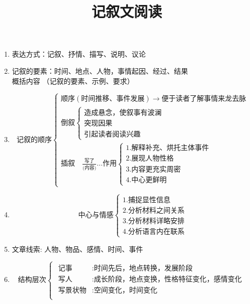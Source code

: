 \documentclass[11pt]{article}
\title{记叙文阅读}
\begin{document}
\maketitle

\begin{enumerate}
\item 表达方式：记叙、抒情、描写、说明、议论

\item 记叙的要素：时间、地点、人物，事情起因、经过、结果 \\
   概括内容 （记叙的要素、示例、要求）

\item
$$
\mbox{记叙的顺序}
\begin{cases}
\mbox{顺序} ( \mbox{时间推移、事件发展} ) \rightarrow \mbox{便于读者了解事情来龙去脉} \\
\mbox{倒叙} 
 \begin{cases}
 \mbox{造成悬念，使叙事有波澜} \\
 \mbox{突现因果} \\
 \mbox{引起读者阅读兴趣}
 \end{cases} \\
\mbox{插叙} \quad \frac{\mbox{写了}}{\mbox{(内容)}} ... \mbox{作用}
  \begin{cases}
  1. \mbox{解释补充、烘托主体事件} \\
  2. \mbox{展现人物性格} \\
  3. \mbox{内容更充实周密} \\
  4. \mbox{中心更鲜明}
  \end{cases}
\end{cases}
$$

\item
$$
\mbox{中心与情感}
\begin{cases}
1. \mbox{捕捉显性信息} \\
2. \mbox{分析材料之间关系} \\
3. \mbox{分析材料详略安排} \\
4. \mbox{分析语言内在联系}
\end{cases}
$$

\item 文章线索: 人物、物品、感情、时间、事件

\item
$$
\mbox{结构层次}
\begin{cases}
\begin{aligned}
\mbox{记事}    & : \mbox{时间先后，地点转换，发展阶段} \\
\mbox{写人}     & : \mbox{成长阶段，地点变换，性格特征变化，感情变化} \\
\mbox{写景状物} & : \mbox{空间变化，时间变化} \\
\end{aligned}
\end{cases}
$$


\end{enumerate}
\end{document}
